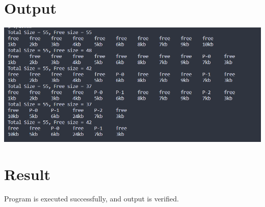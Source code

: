 \section{Output}
\includegraphics[width=\textwidth]{Cycle_2/Outputs/MemoryAlloc.png}

\section{Result}
Program is executed successfully, and output is verified.

